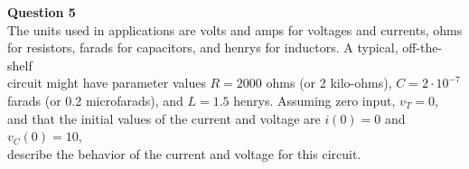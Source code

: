 \documentclass[preview]{standalone}
\begin{document}
\begin{center}
\raggedright
                    \textbf{Question 5}\\
                   The units used in applications are volts and amps for voltages and currents, ohms \\
                    for resistors, farads for capacitors, and henrys for inductors. A typical, off-the-shelf \\
                    circuit might have parameter values $R = 2000$ ohms (or 2 kilo-ohms), $C = 2 · 10^{−7}$ \\
                    farads (or 0.2 microfarads), and $L = 1.5$ henrys. Assuming zero input, $v_T = 0$, \\
                    and that the initial values of the current and voltage are $i(0) = 0$ and $v_C(0) = 10$, \\
                    describe the behavior of the current and voltage for this circuit.
\end{center}
\end{document}
